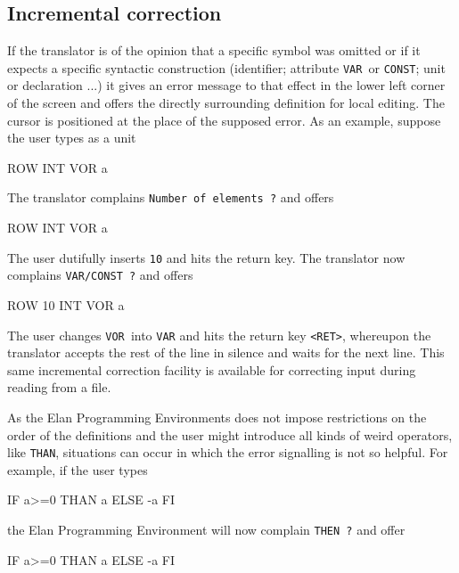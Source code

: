 \subsection{Incremental correction}

If the translator is of the opinion that a specific symbol was
omitted or if it expects a specific syntactic construction (identifier;
attribute {\tt VAR }or {\tt CONST}; unit or declaration ...)
it gives an error message to that effect in the lower left corner
of the screen and offers the directly surrounding definition
for local editing. The cursor is positioned at the place of the
supposed error.
As an example, suppose the user types as a unit

\begin{elan}
        ROW INT VOR a
\end{elan}

\noindent
The translator complains {\tt Number of elements ?} and offers

\begin{elan}
        ROW \cursor INT VOR a
\end{elan}

\noindent
The user dutifully inserts {\tt 10} and hits the return key.
The translator now complains {\tt VAR/CONST ?} and offers

\begin{elan}
        ROW 10 INT \cursor VOR a
\end{elan}

\noindent
The user changes {\tt VOR }into {\tt VAR} and hits the return
key {\tt <RET>}, whereupon the translator accepts the rest of the line
in silence and waits for the next line.
This same incremental correction facility is available for correcting
input during reading from a file.

As the Elan Programming Environments does not impose restrictions
on the order of the definitions and the user might introduce
all kinds of weird operators, like {\tt THAN}, situations can
occur in which the error signalling is not so helpful. For example,
if the user types

\begin{elan}
        IF a>=0 THAN a ELSE -a FI
\end{elan}

\noindent
the Elan Programming Environment will now complain {\tt THEN ?} and
offer

\begin{elan}
        IF a>=0 THAN a \cursor ELSE -a FI
\end{elan}

